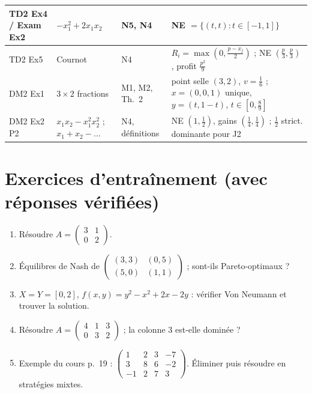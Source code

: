 \documentclass[11pt,a4paper]{article}
\begin{document}
\begin{center}
\begin{tabular}{|p{2.4cm}|p{4.4cm}|p{3.4cm}|p{5.0cm}|}
TD2 Ex4 / Exam Ex2 & $-x_1^2+2x_1x_2$ & N5, N4 & NE $=\{(t,t):t\in[-1,1]\}$\\\hline
TD2 Ex5 & Cournot & N4 & $R_i=\max(0,\frac{p-x_j}2)$ ; NE $(\frac p3,\frac p3)$, profit $\frac{p^2}9$\\\hline
DM2 Ex1 & $3\times2$ fractions & M1, M2, Th.~2 & point selle $(3,2)$, $v=\frac16$ ; $x=(0,0,1)$ unique, $y=(t,1-t)$, $t\in[0,\frac89]$\\\hline
DM2 Ex2 P2 & $x_1x_2-x_1^2x_2^2$ ; $x_1+x_2-\dots$ & N4, définitions & NE $(1,\frac12)$, gains $(\frac14,\frac14)$ ; $\frac12$ strict. dominante pour J2\\\hline
\end{tabular}
\end{center}

\section{Exercices d'entraînement (avec réponses vérifiées)}\label{sec:entrainement}
\begin{enumerate}[label=\textbf{E\arabic*.},leftmargin=*]
\item Résoudre $A=\begin{pmatrix}3&1\\0&2\end{pmatrix}$.
\item Équilibres de Nash de $\begin{pmatrix}(3,3)&(0,5)\\(5,0)&(1,1)\end{pmatrix}$ ; sont-ils Pareto-optimaux ?
\item $X=Y=[0,2]$, $f(x,y)=y^2-x^2+2x-2y$ : vérifier Von Neumann et trouver la solution.
\item Résoudre $A=\begin{pmatrix}4&1&3\\0&3&2\end{pmatrix}$ ; la colonne 3 est-elle dominée ?
\item Exemple du cours p.~19 : $\begin{pmatrix}1&2&3&-7\\3&8&6&-2\\-1&2&7&3\end{pmatrix}$. Éliminer puis résoudre en stratégies mixtes.
\end{enumerate}
\end{document}
